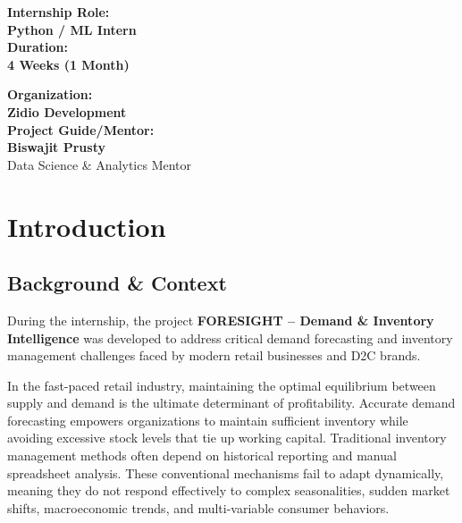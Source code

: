 \documentclass[12pt,a4paper]{report}
\begin{document}
\begin{titlepage}
    \begin{minipage}{0.45\textwidth}
        \begin{center}
            \textcolor{zidiotextgray}{\textbf{Internship Role:}}\\
            \textbf{Python / ML Intern}\\[0.8cm]
            \textcolor{zidiotextgray}{\textbf{Duration:}}\\
            \textbf{4 Weeks (1 Month)}
        \end{center}
    \end{minipage}
    \hfill
    \begin{minipage}{0.45\textwidth}
        \begin{center}
            \textcolor{zidiotextgray}{\textbf{Organization:}}\\
            \textbf{Zidio Development}\\[0.8cm]
            \textcolor{zidiotextgray}{\textbf{Project Guide/Mentor:}}\\
            \textbf{Biswajit Prusty}\\
            \small Data Science \& Analytics Mentor
        \end{center}
    \end{minipage}
    
    \vspace{1cm}
\end{titlepage}

\tableofcontents
\pagebreak
\listoffigures
\pagebreak
\listoftables
\pagebreak

\chapter{Introduction}

\section{Background \& Context}
During the internship, the project \textbf{FORESIGHT – Demand \& Inventory Intelligence} was developed to address critical demand forecasting and inventory management challenges faced by modern retail businesses and D2C brands.

In the fast-paced retail industry, maintaining the optimal equilibrium between supply and demand is the ultimate determinant of profitability. Accurate demand forecasting empowers organizations to maintain sufficient inventory while avoiding excessive stock levels that tie up working capital. Traditional inventory management methods often depend on historical reporting and manual spreadsheet analysis. These conventional mechanisms fail to adapt dynamically, meaning they do not respond effectively to complex seasonalities, sudden market shifts, macroeconomic trends, and multi-variable consumer behaviors.
\end{document}
